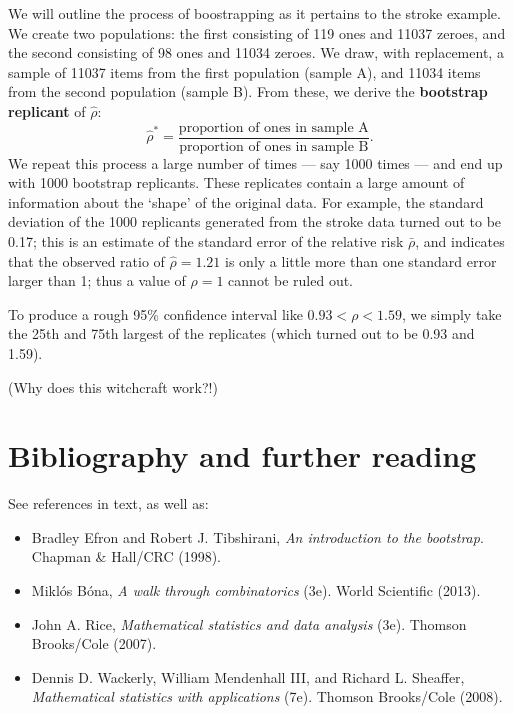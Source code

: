 \documentclass[a4paper,leqno]{article}
\numberwithin{equation}{section}
\theoremstyle{definition}
\theoremstyle{remark}
\newcommand{\df}{\textbf}
\begin{document}
We will outline the process of boostrapping as it pertains to the stroke example. We create two populations: the first consisting of
119 ones and 11037 zeroes, and the second consisting of 98 ones and 11034 zeroes. We draw, with replacement, a sample of 11037 items
from the first population (sample A), and 11034 items from the second population (sample B). From these, we derive the \df{bootstrap replicant} of $ \hat \rho $:
\begin{displaymath}
  \hat \rho^* = \frac{\text{proportion of ones in sample A}}{\text{proportion of ones in sample B}}.
\end{displaymath}
We repeat this process a large number of times --- say 1000 times --- and end up with 1000 bootstrap replicants. These replicates contain
a large amount of information about the `shape' of the original data. For example, the standard deviation of the 1000 replicants generated
from the stroke data turned out to be 0.17; this is an estimate of the standard error of the relative risk $ \bar \rho $, and indicates that
the observed ratio of $ \hat \rho = 1.21 $ is only a little more than one standard error larger than 1; thus a value of $ \rho = 1 $ cannot
be ruled out.

To produce a rough 95\% confidence interval like $ 0.93 < \rho < 1.59 $, we simply take the 25th and 75th largest of the replicates (which
turned out to be 0.93 and 1.59).

(Why does this witchcraft work?!)

\section*{Bibliography and further reading}
See references in text, as well as:
\begin{itemize}
  \item Bradley Efron and Robert J. Tibshirani, \textit{An introduction to the bootstrap}. Chapman \& Hall/CRC (1998).
  \item Mikl\'os B\'ona, \textit{A walk through combinatorics} (3e). World Scientific (2013).
  \item John A. Rice, \textit{Mathematical statistics and data analysis} (3e). Thomson Brooks/Cole (2007).
  \item Dennis D. Wackerly, William Mendenhall III, and Richard L. Sheaffer, \textit{Mathematical statistics with applications} (7e). Thomson Brooks/Cole (2008).
\end{itemize}
\end{document}
